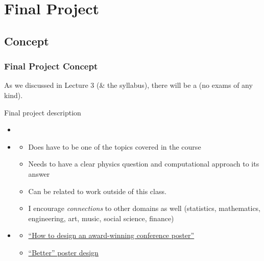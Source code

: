 \documentclass[hyperref={colorlinks=true}]{beamer}
\begin{document}
\section[Final Project]{Final Project}

\subsection[Concept]{Concept}

\begin{frame}%
  \frametitle{Final Project Concept}

  As we discussed in Lecture 3 (\& the syllabus), there will be a  (no exams of any kind).
  
  \vspace{0.3cm}
  
  \begin{ucblock}{Final project  description}
    \begin{itemize}
      \item {}
      \item {}
      \begin{itemize}
        \item Does  have to be one of the topics covered in the course
        \item Needs to have a clear physics question and computational approach to its answer
        \item Can be related to work outside of this class. 
        \item I encourage \textit{connections} to other domains as well (statistics, mathematics, engineering, art, music, social science, finance)
      \end{itemize}
      \item {}
      \begin{itemize}
        \item \href{http://blogs.lse.ac.uk/impactofsocialsciences/2018/05/11/how-to-design-an-award-winning-conference-poster/}{``How to design an award-winning conference poster''}
        \item \href{https://raw.githubusercontent.com/rafaelbailo/betterposter-latex-template/master/example.png}{``Better'' poster design}
      \end{itemize}
    \end{itemize}
  \end{ucblock}

  
\end{frame}
\end{document}
